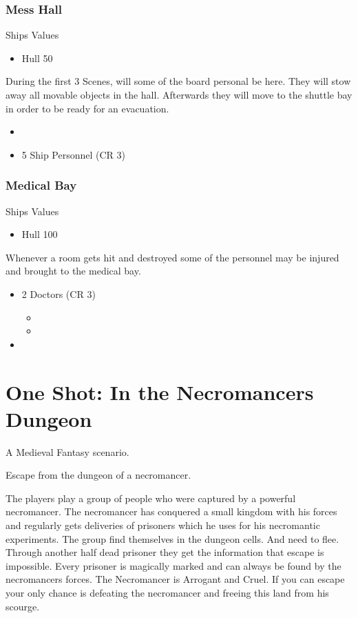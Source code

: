 \documentclass[11pt]{article}
\begin{document}
{\subsubsection{Mess Hall}
\label{sec:orgd33856f}
Ships Values
\begin{itemize}
\item Hull 50
\end{itemize}

During the first 3 Scenes, will some of the board personal be here. They will stow away all movable objects in the hall. Afterwards they will move to the shuttle bay in order to be ready for an evacuation.

\begin{itemize}
\item \aspect{}
\item 5 Ship Personnel (CR 3)
\end{itemize}
\subsubsection{Medical Bay}
\label{sec:orgbe0b628}
Ships Values
\begin{itemize}
\item Hull 100
\end{itemize}

Whenever a room gets hit and destroyed some of the personnel may be injured and brought to the medical bay. 

\begin{itemize}
\item 2 Doctors (CR 3)
\begin{itemize}
\item {}
\item {}
\end{itemize}
\item {}
\end{itemize}
\section{One Shot: In the Necromancers Dungeon}
\label{sec:org2a071b8}

A Medieval Fantasy scenario.

Escape from the dungeon of a necromancer.

The players play a group of people who were captured by a powerful necromancer. The necromancer has conquered a small kingdom with his forces and regularly gets deliveries of prisoners which he uses for his necromantic experiments. The group find themselves in the dungeon cells. And need to flee. Through another half dead prisoner they get the information that escape is impossible. Every prisoner is magically marked and can always be found by the necromancers forces. The Necromancer is Arrogant and Cruel. If you can escape your only chance is defeating the necromancer and freeing this land from his scourge.  
}
\end{document}
